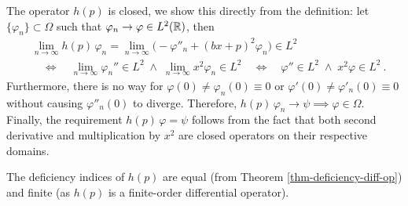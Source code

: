 The operator $h(p)$ is closed, we show this directly from the definition: let $\{ \varphi_n \} \subset \Omega$ such that $\varphi_n \to \varphi \in L^2(\mathbb{R})$, then
\begin{align*}
    &\lim_{n\to\infty} h(p) \, \varphi_n
    = \lim_{n\to\infty} \big( -\varphi''_n + (bx+p)^2 \varphi_n \big)
    \in L^2
    \\[5pt]
    &\quad\Longleftrightarrow\quad
    \lim_{n\to\infty} \varphi_n'' \in L^2
    \;\wedge\;
    \lim_{n\to\infty} x^2 \varphi_n \in L^2
    \quad\Longleftrightarrow\quad
    \varphi'' \in L^2
    \;\wedge\;
    x^2 \varphi  \in L^2
    \: .
\end{align*}
Furthermore, there is no way for $\varphi(0) \neq \varphi_n(0) \equiv 0$ or $\varphi'(0) \neq \varphi'_n(0) \equiv 0$ without causing $\varphi''_n(0)$ to diverge. Therefore, $h(p) \, \varphi_n \to \psi \implies \varphi \in \Omega$. Finally, the requirement $h(p) \, \varphi = \psi$ follows from the fact that both second derivative and multiplication by $x^2$ are closed operators on their respective domains.

The deficiency indices of $h(p)$ are equal (from Theorem \ref{thm-deficiency-diff-op}) and finite (as $h(p)$ is a finite-order differential operator).

